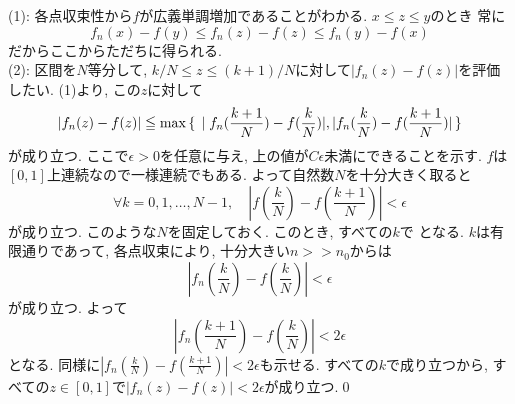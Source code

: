 \begin{egans}
(1): 各点収束性から$f$が広義単調増加であることがわかる. $x\leq z\leq y$のとき 常に
\[ f_n(x) - f(y) \leq   f_n(z) - f(z) \leq f_n(y) - f(x)\]
だからここからただちに得られる. \\
(2): 区間を$N$等分して, $k/N \leq z \leq (k+1)/N$に対して$|f_n(z) - f(z)|$を評価したい. (1)より, この$z$に対して
{\small
\[|f_n(z) - f(z)| \leqq \max{\set{|f_n(\frac{k+1}{N}) - f(\frac{k}{N})|, |f_n(\frac{k}{N}) - f(\frac{k+1}{N}) |}}\]
}
が成り立つ. ここで$\epsilon > 0$を任意に与え, 上の値が$C\epsilon$未満にできることを示す.  $f$は$[0,1]$上連続なので一様連続でもある. よって自然数$N$を十分大きく取ると
\[\forall k=0,1,\dots, N-1,\quad |f(\frac{k}{N}) - f(\frac{k+1}{N})| < \epsilon \]
が成り立つ. このような$N$を固定しておく. このとき, すべての$k$で
となる. $k$は有限通りであって, 各点収束により, 十分大きい$n>>n_0$からは
\[|f_n(\frac{k}{N}) - f(\frac{k}{N})| < \epsilon\]
が成り立つ. よって
\[|f_n(\frac{k+1}{N}) - f(\frac{k}{N})| < 2\epsilon\]
となる. 同様に$|f_n(\frac{k}{N}) - f(\frac{k+1}{N})| < 2\epsilon$も示せる. すべての$k$で成り立つから, すべての$z\in [0,1]$で$|f_n(z) - f(z)| < 2\epsilon$が成り立つ.\qed
\end{egans}



